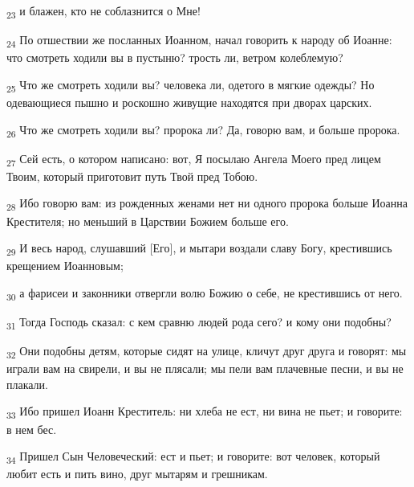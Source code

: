 \begin{tcolorbox}
\textsubscript{23} и блажен, кто не соблазнится о Мне!
\end{tcolorbox}
\begin{tcolorbox}
\textsubscript{24} По отшествии же посланных Иоанном, начал говорить к народу об Иоанне: что смотреть ходили вы в пустыню? трость ли, ветром колеблемую?
\end{tcolorbox}
\begin{tcolorbox}
\textsubscript{25} Что же смотреть ходили вы? человека ли, одетого в мягкие одежды? Но одевающиеся пышно и роскошно живущие находятся при дворах царских.
\end{tcolorbox}
\begin{tcolorbox}
\textsubscript{26} Что же смотреть ходили вы? пророка ли? Да, говорю вам, и больше пророка.
\end{tcolorbox}
\begin{tcolorbox}
\textsubscript{27} Сей есть, о котором написано: вот, Я посылаю Ангела Моего пред лицем Твоим, который приготовит путь Твой пред Тобою.
\end{tcolorbox}
\begin{tcolorbox}
\textsubscript{28} Ибо говорю вам: из рожденных женами нет ни одного пророка больше Иоанна Крестителя; но меньший в Царствии Божием больше его.
\end{tcolorbox}
\begin{tcolorbox}
\textsubscript{29} И весь народ, слушавший [Его], и мытари воздали славу Богу, крестившись крещением Иоанновым;
\end{tcolorbox}
\begin{tcolorbox}
\textsubscript{30} а фарисеи и законники отвергли волю Божию о себе, не крестившись от него.
\end{tcolorbox}
\begin{tcolorbox}
\textsubscript{31} Тогда Господь сказал: с кем сравню людей рода сего? и кому они подобны?
\end{tcolorbox}
\begin{tcolorbox}
\textsubscript{32} Они подобны детям, которые сидят на улице, кличут друг друга и говорят: мы играли вам на свирели, и вы не плясали; мы пели вам плачевные песни, и вы не плакали.
\end{tcolorbox}
\begin{tcolorbox}
\textsubscript{33} Ибо пришел Иоанн Креститель: ни хлеба не ест, ни вина не пьет; и говорите: в нем бес.
\end{tcolorbox}
\begin{tcolorbox}
\textsubscript{34} Пришел Сын Человеческий: ест и пьет; и говорите: вот человек, который любит есть и пить вино, друг мытарям и грешникам.
\end{tcolorbox}
